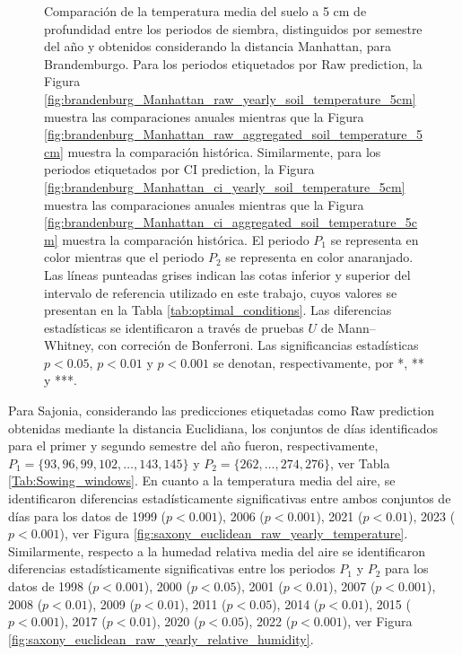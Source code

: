 \begin{figure}[htbp]
	\caption{
		Comparación de la temperatura media del suelo a 5 cm de profundidad entre los periodos de siembra, distinguidos por semestre del año y obtenidos considerando la distancia Manhattan, para Brandemburgo. Para los periodos etiquetados por Raw prediction, la Figura \ref{fig:brandenburg_Manhattan_raw_yearly_soil_temperature_5cm} muestra las comparaciones anuales mientras que la Figura \ref{fig:brandenburg_Manhattan_raw_aggregated_soil_temperature_5cm} muestra la comparación histórica. Similarmente, para los periodos etiquetados por CI prediction, la Figura \ref{fig:brandenburg_Manhattan_ci_yearly_soil_temperature_5cm} muestra las comparaciones anuales mientras que la Figura \ref{fig:brandenburg_Manhattan_ci_aggregated_soil_temperature_5cm} muestra la comparación histórica. El periodo $P_1$ se representa en color mientras que el periodo $P_2$ se representa en color anaranjado. Las líneas punteadas grises indican las cotas inferior y superior del intervalo de referencia utilizado en este trabajo, cuyos valores se presentan en la Tabla \ref{tab:optimal_conditions}. Las diferencias estadísticas se identificaron a través de pruebas $U$ de Mann--Whitney, con correción de Bonferroni. Las significancias estadísticas $p<0.05$, $p<0.01$ y $p<0.001$ se denotan, respectivamente, por *, ** y ***.
	}
	\label{fig:brandenburg_Manhattan_soil_temperature_5cm}
	
	
\end{figure}

\newpage
Para Sajonia, considerando las predicciones etiquetadas como Raw prediction obtenidas mediante la distancia Euclidiana, los conjuntos de días identificados para el primer y segundo semestre del año fueron, respectivamente, $P_1=\{93, 96, 99, 102, \ldots, 143, 145\}$ y $P_2=\{262,\ldots,274, 276\}$, ver Tabla \ref{Tab:Sowing_windows}. En cuanto a la temperatura media del aire, se identificaron diferencias estadísticamente significativas entre ambos conjuntos de días para los datos de 1999	($p<0.001$), 2006	($p<0.001$), 2021	($p<0.01$), 2023	($p<0.001$), ver Figura \ref{fig:saxony_euclidean_raw_yearly_temperature}.\\


Similarmente, respecto a la humedad relativa media del aire se identificaron diferencias estadísticamente significativas entre los periodos $P_1$ y $P_2$ para los datos de 1998	($p<0.001$), 2000	($p<0.05$), 2001	($p<0.01$), 2007	($p<0.001$), 2008	($p<0.01$), 2009	($p<0.01$), 2011	($p<0.05$), 2014	($p<0.01$), 2015	($p<0.001$), 2017	($p<0.01$), 2020	($p<0.05$), 2022	($p<0.001$), ver Figura \ref{fig:saxony_euclidean_raw_yearly_relative_humidity}.\\

